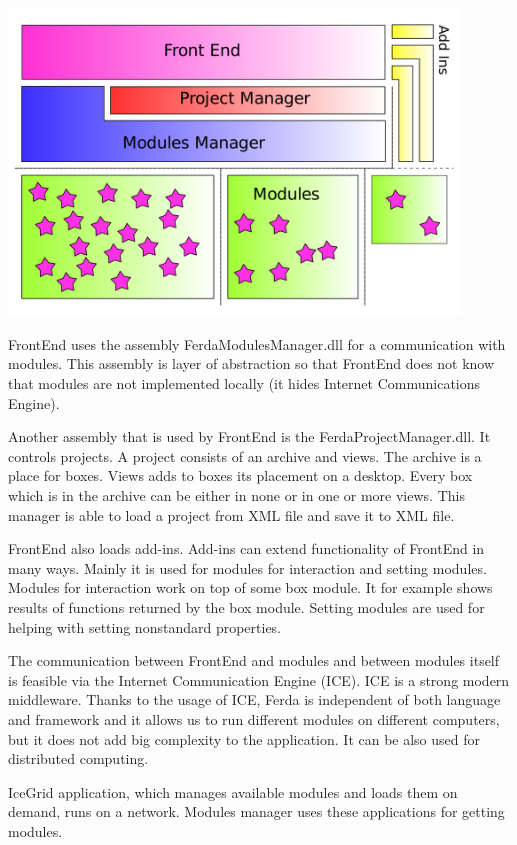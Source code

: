 \documentclass[a4paper,12pt]{book}
\begin{document}
\noindent\includegraphics[width=12cm]{designB}

FrontEnd uses the assembly FerdaModulesManager.dll for a communication with modules. This assembly is layer of abstraction so that FrontEnd does not know that modules are not implemented locally (it hides Internet Communications Engine).

Another assembly that is used by FrontEnd is the FerdaProjectManager.dll. It controls projects. A project consists of an archive and views. The archive is a place for boxes. Views adds to boxes its placement on a desktop. Every box which is in the archive can be either in none or in one or more views. This manager is able to load a project from XML file and save it to XML file.

FrontEnd also loads add-ins. Add-ins can extend functionality of FrontEnd in many ways. Mainly it is used for modules for interaction and setting modules. Modules for interaction work on top of some box module. It for example shows results of functions returned by the box module. Setting modules are used for helping with setting nonstandard properties.

The communication between FrontEnd and modules and between modules itself is feasible via the Internet Communication Engine (ICE). ICE is a strong modern middleware. Thanks to the usage of ICE, Ferda is independent of both language and framework and it allows us to run different modules on different computers, but it does not add big complexity to the application. It can be also used for distributed computing.

IceGrid application, which manages available modules and loads them on demand, runs on a network. Modules manager uses these applications for getting modules.
\end{document}
